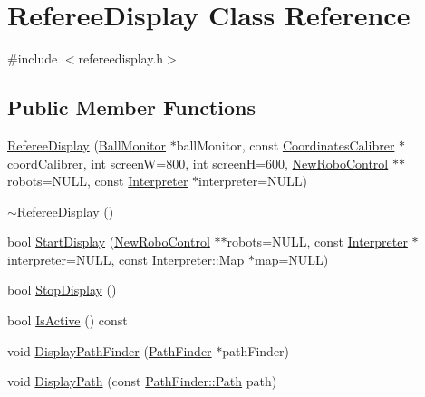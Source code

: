 \hypertarget{classRefereeDisplay}{
\section{RefereeDisplay Class Reference}
\label{classRefereeDisplay}
}


{\ttfamily \#include $<$refereedisplay.h$>$}

\subsection*{Public Member Functions}
\begin{DoxyCompactItemize}
\item 
\hyperlink{classRefereeDisplay_a8f7d4872a24b44b96a36a5bbf991f5d2}{RefereeDisplay} (\hyperlink{classBallMonitor}{BallMonitor} $\ast$ballMonitor, const \hyperlink{classCoordinatesCalibrer}{CoordinatesCalibrer} $\ast$coordCalibrer, int screenW=800, int screenH=600, \hyperlink{classNewRoboControl}{NewRoboControl} $\ast$$\ast$robots=NULL, const \hyperlink{classInterpreter}{Interpreter} $\ast$interpreter=NULL)
\item 
\hyperlink{classRefereeDisplay_a5a9191c0d7f937df62ea9544d9e38f3b}{$\sim$RefereeDisplay} ()
\item 
bool \hyperlink{classRefereeDisplay_a6b789ef1ca73c72556cf5051a8a2b5a6}{StartDisplay} (\hyperlink{classNewRoboControl}{NewRoboControl} $\ast$$\ast$robots=NULL, const \hyperlink{classInterpreter}{Interpreter} $\ast$interpreter=NULL, const \hyperlink{classMatrix}{Interpreter::Map} $\ast$map=NULL)
\item 
bool \hyperlink{classRefereeDisplay_aafa710132ce88c4e6cb4d430baf26173}{StopDisplay} ()
\item 
bool \hyperlink{classRefereeDisplay_a216bbade42b7c7694f69d73c35620fc6}{IsActive} () const 
\item 
void \hyperlink{classRefereeDisplay_a0ef334a53e0fde02da30460ed2fcbe06}{DisplayPathFinder} (\hyperlink{classPathFinder}{PathFinder} $\ast$pathFinder)
\item 
void \hyperlink{classRefereeDisplay_ad7f07077e92fd46956bf1aa25715e414}{DisplayPath} (const \hyperlink{classPathFinder_a269aba09b7b3208092f67f2bc02cf63e}{PathFinder::Path} path)
\end{DoxyCompactItemize}
